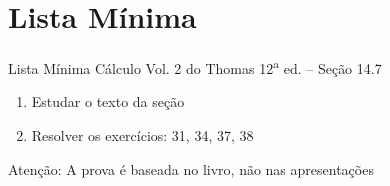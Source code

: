 \documentclass[fleqn,utf8,aspectratio=169,12pt]{beamer}
\begin{document}



\section{Lista Mínima}

\begin{frame}{Lista Mínima}
  Cálculo Vol. 2 do Thomas 12\textsuperscript{a} ed. -- Seção 14.7
  \begin{enumerate}
    \item Estudar o texto da seção
    \item Resolver os exercícios: 31, 34, 37, 38
  \end{enumerate}

  \vfill
  Atenção: A prova é baseada no livro, não nas apresentações
\end{frame}

\end{document}
